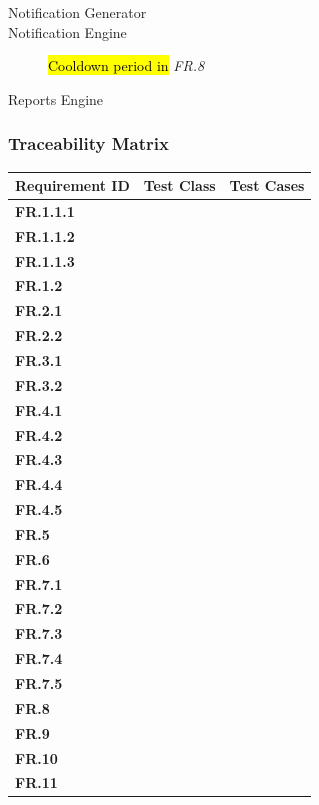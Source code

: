 \documentclass[10pt,a4paper]{article}
\newcommand{\fr}[1]{\textcolor{reqColor}{\textbf{FR.#1}}}
\newcommand{\frit}[1]{\textit{FR.#1}}
\begin{document}
\begin{description}
  \item[Notification Generator] %
  
  \item[Notification Engine] %
  \hl{Cooldown period in} \frit{8}

  \item[Reports Engine] %
  
 \end{description}

\subsubsection{Traceability Matrix}

\begin{longtable}[H]{| p{2.3cm} | p{2.7cm} | p{7cm}|}
  \hline\rowcolor{titleColor} \textbf{Requirement ID} & \textbf{Test Class} & \textbf{Test Cases}\\
  \hline \fr{1.1.1} & & \\
  \hline \fr{1.1.2} & & \\
  \hline \fr{1.1.3} & & \\
  \hline \fr{1.2}   & & \\
  \hline \fr{2.1}   & & \\
  \hline \fr{2.2}   & & \\
  \hline \fr{3.1}   & & \\
  \hline \fr{3.2}   & & \\
  \hline \fr{4.1}   & & \\
  \hline \fr{4.2}   & & \\
  \hline \fr{4.3}   & & \\
  \hline \fr{4.4}   & & \\
  \hline \fr{4.5}   & & \\
  \hline \fr{5}     & & \\
  \hline \fr{6}     & & \\
  \hline \fr{7.1}   & & \\
  \hline \fr{7.2}   & & \\
  \hline \fr{7.3}   & & \\
  \hline \fr{7.4}   & & \\
  \hline \fr{7.5}   & & \\
  \hline \fr{8}     & & \\
  \hline \fr{9}     & & \\
  \hline \fr{10}    & & \\
  \hline \fr{11}    & & \\

\end{longtable}
\end{document}
